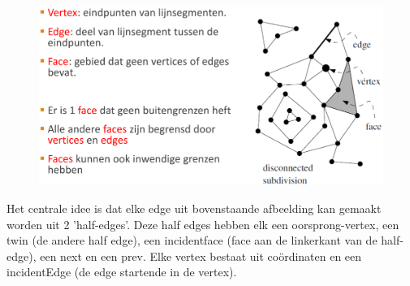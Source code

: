\documentclass[12pt,a4paper]{article}
\begin{document}
	\begin{figure}[H]
		\centering
		\includegraphics[width=0.8\linewidth]{afbeeldingen/DCEL-termen}
		\label{fig:dcel-termen}
	\end{figure}

	Het centrale idee is dat elke edge uit bovenstaande afbeelding kan gemaakt worden uit 2 'half-edges'. Deze half edges hebben elk een oorsprong-vertex, een twin (de andere half edge), een incidentface (face aan de linkerkant van de half-edge), een next en een prev. Elke vertex bestaat uit coördinaten en een incidentEdge (de edge startende in de vertex). 
	
\end{document}
